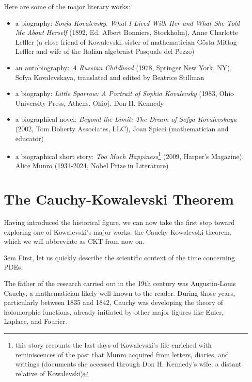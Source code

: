 Here are some of the major literary works:
\begin{itemize}

\item a biography: \textit{Sonja Kovalevsky. What I Lived With Her and What She Told Me About Herself} (1892, Ed. Albert Bonniers, Stockholm), Anne Charlotte Leffler (a close friend of Kowalevski, sister of mathematician Gösta Mittag-Leffler and wife of the Italian algebraist Pasquale del Pezzo)

\item an autobiography: \textit{A Russian Childhood} (1978, Springer New York, NY), Sofya Kovalevskaya, translated and edited by Beatrice Stillman

\item a biography: \textit{Little Sparrow: A Portrait of Sophia Kovalevsky} (1983, Ohio University Press, Athens, Ohio), Don H. Kennedy

\item a biographical novel: \textit{Beyond the Limit: The Dream of Sofya Kovalevskaya} (2002, Tom Doherty Associates, LLC), Joan Spicci (mathematician and educator)

\item a biographical short story: \textit{Too Much Happiness}\footnote{this story recounts the last days of Kowalevski's life enriched with reminiscences of the past that Munro acquired from letters, diaries, and writings (documents she accessed through Don H. Kennedy's wife, a distant relative of Kowalevski)} (2009, Harper's Magazine), Alice Munro (1931-2024, Nobel Prize in Literature)

\end{itemize}

\section{The Cauchy-Kowalevski Theorem}\label{introck}

Having introduced the historical figure, we can now take the first step toward exploring one of Kowalevski's major works: the Cauchy-Kowalevski theorem, which we will abbreviate as CKT from now on.

\emergencystretch 3em
First, let us quickly describe the scientific context of the time concerning PDEs.

The father of the research carried out in the 19th century was Augustin-Louis Cauchy, a mathematician likely well-known to the reader. During those years, particularly between 1835 and 1842, Cauchy was developing the theory of holomorphic functions, already initiated by other major figures like Euler, Laplace, and Fourier.


